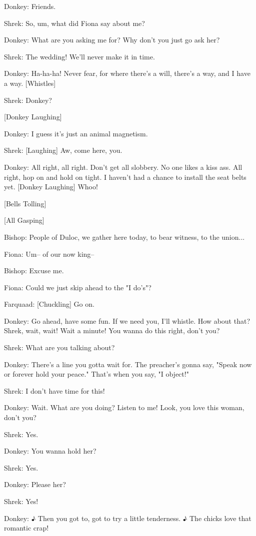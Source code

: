 \documentclass{article}
\begin{document}
Donkey:
Friends.

Shrek:
So, um, what did Fiona say about me?

Donkey:
What are you asking me for? Why don't you just go ask her?

Shrek:
The wedding! We'll never make it in time.

Donkey:
Ha-ha-ha! Never fear, for where there's a will, there's a way, and I have a way. [Whistles]

Shrek:
Donkey?

[Donkey Laughing]

Donkey:
I guess it's just an animal magnetism.

Shrek:
[Laughing] Aw, come here, you.

Donkey:
All right, all right. Don't get all slobbery. No one likes a kiss ass. All right, hop on and hold on tight. I haven't had a chance to install the seat belts yet. [Donkey Laughing] Whoo!

[Bells Tolling]

[All Gasping]

Bishop:
People of Duloc, we gather here today, to bear witness, to the union...

Fiona:
Um-- of our now king--

Bishop:
Excuse me.

Fiona:
Could we just skip ahead to the "I do's"?

Farquaad:
[Chuckling] Go on.

Donkey:
Go ahead, have some fun. If we need you, I'll whistle. How about that? Shrek, wait, wait! Wait a minute! You wanna do this right, don't you?

Shrek:
What are you talking about?

Donkey:
There's a line you gotta wait for. The preacher's gonna say, "Speak now or forever hold your peace." That's when you say, "I object!"

Shrek:
I don't have time for this!

Donkey:
Wait. What are you doing? Listen to me! Look, you love this woman, don't you?

Shrek:
Yes.

Donkey:
You wanna hold her?

Shrek:
Yes.

Donkey:
Please her?

Shrek:
Yes!

Donkey:
♪ Then you got to, got to try a little tenderness. ♪ The chicks love that romantic crap!
\end{document}

